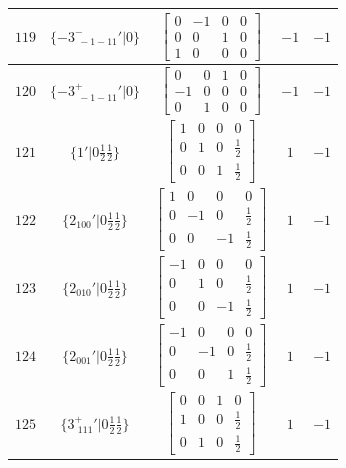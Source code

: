 \documentclass[fleqn,8pt]{jsarticle}
\begin{document}
\begin{longtable}{ccccc}
$ 119 $ & $ \{-3^{-}_{\,\,-1-11}{}'|0\} $ & $ \begin{bmatrix} 0 & -1 & 0 & 0 \\ 0 & 0 & 1 & 0 \\ 1 & 0 & 0 & 0 \end{bmatrix} $ & $ -1 $ & $ -1 $ \\ \hline
$ 120 $ & $ \{-3^{+}_{\,\,-1-11}{}'|0\} $ & $ \begin{bmatrix} 0 & 0 & 1 & 0 \\ -1 & 0 & 0 & 0 \\ 0 & 1 & 0 & 0 \end{bmatrix} $ & $ -1 $ & $ -1 $ \\ \hline
$ 121 $ & $ \{1{}'|0 \frac{1}{2} \frac{1}{2}\} $ & $ \begin{bmatrix} 1 & 0 & 0 & 0 \\ 0 & 1 & 0 & \frac{1}{2} \\ 0 & 0 & 1 & \frac{1}{2} \end{bmatrix} $ & $ 1 $ & $ -1 $ \\ \hline
$ 122 $ & $ \{2{}_{100}{}'|0 \frac{1}{2} \frac{1}{2}\} $ & $ \begin{bmatrix} 1 & 0 & 0 & 0 \\ 0 & -1 & 0 & \frac{1}{2} \\ 0 & 0 & -1 & \frac{1}{2} \end{bmatrix} $ & $ 1 $ & $ -1 $ \\ \hline
$ 123 $ & $ \{2{}_{010}{}'|0 \frac{1}{2} \frac{1}{2}\} $ & $ \begin{bmatrix} -1 & 0 & 0 & 0 \\ 0 & 1 & 0 & \frac{1}{2} \\ 0 & 0 & -1 & \frac{1}{2} \end{bmatrix} $ & $ 1 $ & $ -1 $ \\ \hline
$ 124 $ & $ \{2{}_{001}{}'|0 \frac{1}{2} \frac{1}{2}\} $ & $ \begin{bmatrix} -1 & 0 & 0 & 0 \\ 0 & -1 & 0 & \frac{1}{2} \\ 0 & 0 & 1 & \frac{1}{2} \end{bmatrix} $ & $ 1 $ & $ -1 $ \\ \hline
$ 125 $ & $ \{3^{+}_{\,\,111}{}'|0 \frac{1}{2} \frac{1}{2}\} $ & $ \begin{bmatrix} 0 & 0 & 1 & 0 \\ 1 & 0 & 0 & \frac{1}{2} \\ 0 & 1 & 0 & \frac{1}{2} \end{bmatrix} $ & $ 1 $ & $ -1 $ \\ \hline

\end{longtable}
\end{document}

